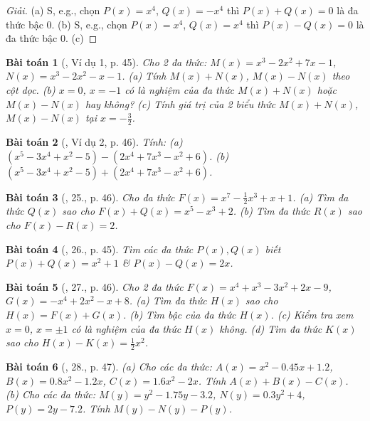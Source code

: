 \documentclass{article}
\newtheorem{baitoan}{Bài toán}
\begin{document}
\begin{proof}[Giải]
	(a) S, e.g., chọn $P(x) = x^4$, $Q(x) = -x^4$ thì $P(x) + Q(x) = 0$ là đa thức bậc 0. (b) S, e.g., chọn $P(x) = x^4$, $Q(x) = x^4$ thì $P(x) - Q(x) = 0$ là đa thức bậc 0. (c)
\end{proof}

\begin{baitoan}[\cite{SBT_Toan_7_Canh_Dieu_tap_2}, Ví dụ 1, p. 45]
	Cho 2 đa thức: $M(x) =  x^3 - 2x^2 + 7x - 1$, $N(x) = x^3 - 2x^2 - x - 1$. (a) Tính $M(x) + N(x)$, $M(x) - N(x)$ theo cột dọc. (b) $x = 0$, $x = -1$ có là nghiệm của đa thức $M(x) + N(x)$ hoặc $M(x) - N(x)$ hay không? (c) Tính giá trị của 2 biểu thức $M(x) + N(x)$, $M(x) - N(x)$ tại $x = -\frac{3}{2}$.
\end{baitoan}

\begin{baitoan}[\cite{SBT_Toan_7_Canh_Dieu_tap_2}, Ví dụ 2, p. 46]
	Tính: (a) $(x^5 - 3x^4 + x^2 - 5) - (2x^4 + 7x^3 - x^2 + 6)$. (b) $(x^5 - 3x^4 + x^2 - 5) + (2x^4 + 7x^3 - x^2 + 6)$.
\end{baitoan}

\begin{baitoan}[\cite{SBT_Toan_7_Canh_Dieu_tap_2}, 25., p. 46]
	Cho đa thức $F(x) = x^7 - \frac{1}{2}x^3 + x + 1$. (a) Tìm đa thức $Q(x)$ sao cho $F(x) + Q(x) = x^5 - x^3 + 2$. (b) Tìm đa thức $R(x)$ sao cho $F(x) - R(x) = 2$.
\end{baitoan}

\begin{baitoan}[\cite{SBT_Toan_7_Canh_Dieu_tap_2}, 26., p. 45]
	Tìm các đa thức $P(x),Q(x)$ biết $P(x) + Q(x) = x^2 + 1$ \& $P(x) - Q(x) = 2x$.
\end{baitoan}

\begin{baitoan}[\cite{SBT_Toan_7_Canh_Dieu_tap_2}, 27., p. 46]
	Cho 2 đa thức $F(x) = x^4 + x^3 - 3x^2 + 2x - 9$, $G(x) = -x^4 + 2x^2 - x + 8$. (a) Tìm đa thức $H(x)$ sao cho $H(x) = F(x) + G(x)$. (b) Tìm bậc của đa thức $H(x)$. (c) Kiểm tra xem $x = 0$, $x = \pm1$ có là nghiệm của đa thức $H(x)$ không. (d) Tìm đa thức $K(x)$ sao cho $H(x) - K(x) = \frac{1}{2}x^2$.
\end{baitoan}

\begin{baitoan}[\cite{SBT_Toan_7_Canh_Dieu_tap_2}, 28., p. 47]
	(a) Cho các đa thức: $A(x) = x^2 - 0.45x + 1.2$, $B(x) = 0.8x^2 - 1.2x$, $C(x) = 1.6x^2 - 2x$. Tính $A(x) + B(x) - C(x)$. (b) Cho các đa thức: $M(y) = y^2 - 1.75y - 3.2$, $N(y) = 0.3y^2 + 4$, $P(y) = 2y - 7.2$. Tính $M(y) - N(y) - P(y)$.
\end{baitoan}
\end{document}
